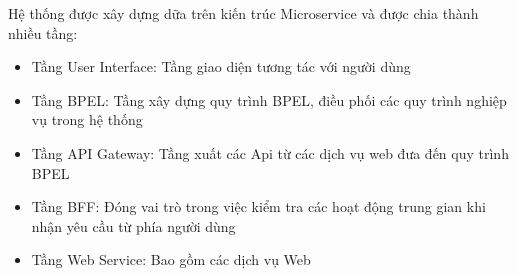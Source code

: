 Hệ thống được xây dựng dữa trên kiến trúc Microservice và được chia thành nhiều tầng:
\begin{itemize}
	\item Tầng User Interface: Tầng giao diện tương tác với người dùng
	\item Tầng BPEL: Tầng xây dựng quy trình BPEL, điều phối các quy trình nghiệp vụ trong hệ thống
	\item Tầng API Gateway: Tầng xuất các Api từ các dịch vụ web đưa đến quy trình BPEL
	\item Tầng BFF: Đóng vai trò trong việc kiểm tra các hoạt động trung gian khi nhận yêu cầu từ phía người dùng
	\item Tầng Web Service: Bao gồm các dịch vụ Web 
\end{itemize}



